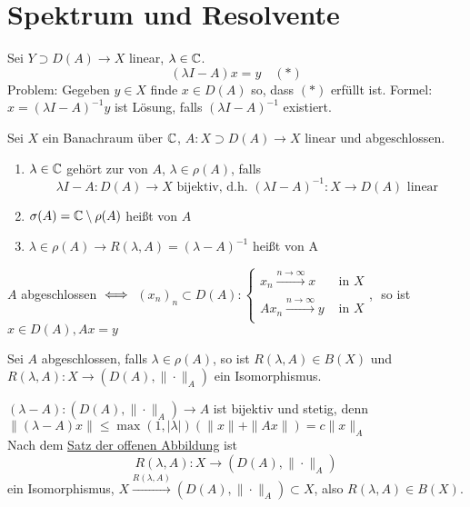 
\section{Spektrum und Resolvente}



Sei $Y \supset D(A) \rightarrow X$ linear, $\lambda \in \mathbb{C}$.
	\[ (\lambda I - A) x = y \quad (*) \label{eq:13.0-lineareGleichung} \]
Problem: Gegeben $y \in X$ finde $x \in D(A)$ so, dass \hyperref[eq:13.0-lineareGleichung]{$(*)$} erfüllt ist.
Formel: $x = (\lambda I - A)^{-1} y$ ist Lösung, falls $(\lambda I - A)^{-1}$ existiert.


\begin{definition} \label{def:13.1}
	Sei $X$ ein Banachraum über $\mathbb{C}$, $A \colon X \supset D(A) \rightarrow X$ linear und abgeschlossen.
	\begin{enumerate}[label=\alph*\upshape)]
		\item $\lambda \in \mathbb{C}$ gehört zur  von $A$, $\lambda \in \rho(A)$, falls
			\[ \lambda I - A \colon D(A) \rightarrow X \text{ bijektiv, d.h. } (\lambda I - A)^{-1} \colon X \rightarrow D(A) \text{ linear} \]
		\item $\sigma(A) = \mathbb{C} \setminus \rho(A)$ hei{\ss}t  von $A$
		\item $\lambda \in \rho(A) \rightarrow R(\lambda, A) = (\lambda - A)^{-1}$ hei{\ss}t  von A
	\end{enumerate}	
\end{definition}


\begin{erinnerung}
	$A$ abgeschlossen $\iff$ $(x_{n})_{n} \subset D(A): \begin{cases}
			x_{n} \xrightarrow[]{n \rightarrow \infty} x & \text{ in } X \\ A x_{n} \xrightarrow[]{n \rightarrow \infty} y & \text{ in } X \end{cases}$, $ $ so ist $x \in D(A), A x = y$\end{erinnerung}


\begin{bemerkung}
	Sei $A$ abgeschlossen, falls $\lambda \in \rho(A)$, so ist $R(\lambda, A) \in B(X)$ und $R(\lambda, A) \colon X \rightarrow (D(A), \| \cdot \|_{A})$ ein Isomorphismus.
\end{bemerkung}

\begin{beweis}
	$(\lambda - A): (D(A), \| \cdot \|_{A}) \rightarrow A$ ist bijektiv und stetig, denn $\|(\lambda - A)x \| \leq \max(1, |\lambda|) (\|x\| + \|Ax\|) = c \| x \|_{A}$ \\
	Nach dem \hyperref[satz:10.3-offeneAbbildung]{Satz der offenen Abbildung} ist
		\[ R(\lambda, A): X \rightarrow (D(A), \| \cdot \|_{A}) \]
	ein Isomorphismus, $X \xrightarrow[]{R(\lambda, A)} (D(A), \| \cdot \|_{A}) \subset X$, also $R(\lambda, A) \in B(X)$.
\end{beweis}


